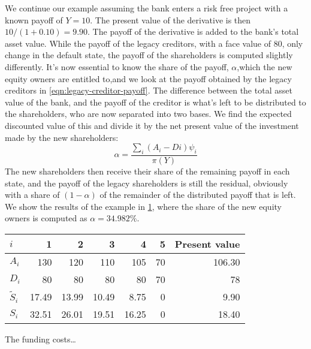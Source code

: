 \documentclass[../main.tex]{subfiles}
\begin{document}
        We continue our example assuming the bank enters a risk free project with a known payoff of $Y=10$. The present value of the derivative is then $10/(1+0.10)=9.90$. The payoff of the derivative is added to the bank's total asset value. While the payoff of the legacy creditors, with a face value of 80, only change in the default state, the payoff of the shareholders is computed slightly differently. It's now essential to know the share of the payoff, $\alpha$,which the new equity owners are entitled to,and we look at the payoff obtained by the legacy creditors in \cref{eqn:legacy-creditor-payoff}. The difference between the total asset value of the bank, and the payoff of the creditor is what's left to be distributed to the shareholders, who are now separated into two bases. We find the expected discounted value of this and divide it by the net present value of the investment made by the new shareholders:
        \begin{equation}
            \alpha = \frac{\sum_i (A_{i}-D{i})\psi_{i}}{\pi(Y)}
        \end{equation}
        The new shareholders then receive their share of the remaining payoff in each state, and the payoff of the legacy shareholders is still the residual, obviously with a share of $(1-\alpha)$ of the remainder of the distributed payoff that is left. We show the results of the example in \cref{tbl:equity-funding-payoff}, where the share of the new equity owners is computed as $\alpha = 34.982\%$.

        \begin{table}[h]
            \centering\begin{tabular}{l|rrrrr||r}
                $i$ & 1 & 2 & 3 & 4 & 5 & Present value \\
                \hline
                $A_{i}$ & 130 & 120 & 110 & 105 & 70 & 106.30 \\
                $D_{i}$ & 80 & 80 & 80 & 80 & 70 & 78 \\
                $\tilde{S}_{i}$ & 17.49 & 13.99 & 10.49 & 8.75 & 0 & 9.90 \\
                $S_{i}$ & 32.51 & 26.01 & 19.51 & 16.25 & 0 & 18.40 \\
            \end{tabular}
            \label{tbl:equity-funding-payoff}
        \end{table}

        The funding costs\dots
\end{document}
